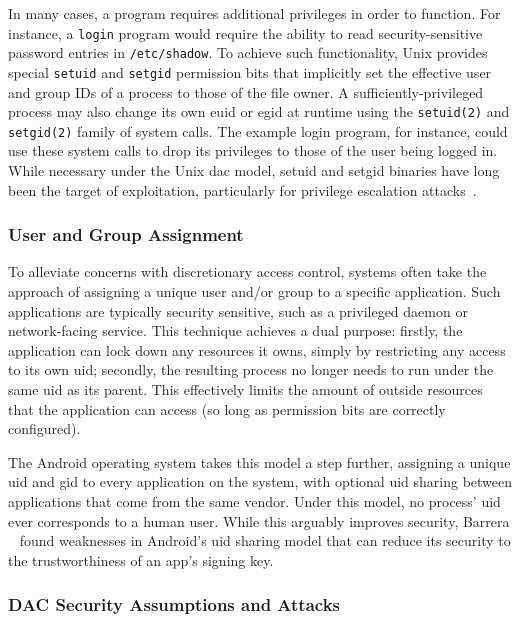 In many cases, a program requires additional privileges in order to function. For
instance, a \texttt{login} program would require the ability to read security-sensitive
password entries in \texttt{/etc/shadow}. To achieve such functionality, Unix provides
special \texttt{setuid} and \texttt{setgid} permission bits that implicitly set the
effective user and group IDs of a process to those of the file owner.
A sufficiently-privileged process may also change its own \gls{euid} or \gls{egid} at
runtime using the \texttt{setuid(2)} and \texttt{setgid(2)} family of system calls. The
example login program, for instance, could use these system calls to drop its privileges
to those of the user being logged in. While necessary under the Unix \gls{dac} model,
setuid and setgid binaries have long been the target of exploitation, particularly for
privilege escalation attacks~\cite{dittmer2014_setuid, van_oorschot2020_tools_jewels,
jaeger2008_os_security}.

\subsubsection*{User and Group Assignment}

To alleviate concerns with discretionary access control, systems often take the approach
of assigning a unique user and/or group to a specific application. Such applications are
typically security sensitive, such as a privileged daemon or network-facing service. This
technique achieves a dual purpose: firstly, the application can lock down any resources it
owns, simply by restricting any access to its own \gls{uid}; secondly, the resulting
process no longer needs to run under the same \gls{uid} as its parent. This effectively
limits the amount of outside resources that the application can access (so long as
permission bits are correctly configured).

The Android operating system takes this model a step further, assigning a unique \gls{uid}
and \gls{gid} to every application on the system, with optional \gls{uid} sharing between
applications that come from the same vendor. Under this model, no process' \gls{uid} ever
corresponds to a human user. While this arguably improves security, Barrera
\etal~\cite{barrera2012_android} found weaknesses in Android's \gls{uid} sharing model
that can reduce its security to the trustworthiness of an app's signing key.

\subsubsection*{DAC Security Assumptions and Attacks}

